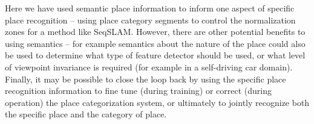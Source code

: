 \documentclass[letterpaper, 10 pt, conference]{ieeeconf}  %
\begin{document}
Here we have used semantic place information to inform one aspect of specific place recognition – using place category segments to control the normalization zones for a method like SeqSLAM. However, there are other potential benefits to using semantics – for example semantics about the nature of the place could also be used to determine what type of feature detector should be used, or what level of viewpoint invariance is required (for example in a self-driving car domain). Finally, it may be possible to close the loop back by using the specific place recognition information to fine tune (during training) or correct (during operation) the place categorization system, or ultimately to jointly recognize both the specific place and the category of place.










\end{document}
